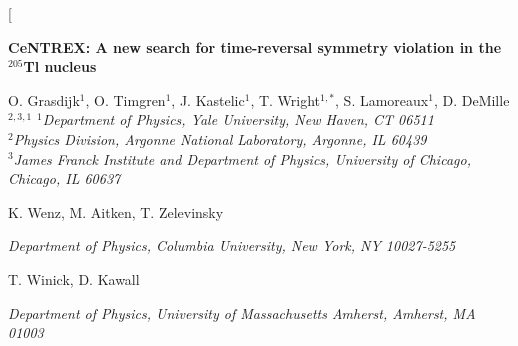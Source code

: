 

\appendix


%
%

{

	\small
	
	
}



\twocolumn[
\begin{@twocolumnfalse}
	\begin{center}
		\begin{minipage}{.8\textwidth}
			\centering
			\vspace{4.5ex}

			{\bf\large CeNTREX: A new search for time-reversal symmetry violation in the $^{205}$Tl nucleus}

			\vspace{1.5ex}
			O. Grasdijk$^1$, O. Timgren$^1$, J. Kastelic$^1$, T. Wright$^{1,*}$, S. Lamoreaux$^1$, D. DeMille$^{2,3,1}$
			{\it\small 
			$^1$Department of Physics, Yale University, New Haven, CT 06511\\
			$^2$Physics Division, Argonne National Laboratory, Argonne, IL 60439\\
			$^3$James Franck Institute and Department of Physics, University of Chicago, Chicago, IL 60637
			}

			\vspace{1.5ex}
			K. Wenz, M. Aitken, T. Zelevinsky

			{\it\small Department of Physics, Columbia University, New York, NY 10027-5255}

			\vspace{1.5ex}
			T. Winick, D. Kawall

			{\it\small Department of Physics, University of Massachusetts Amherst, Amherst, MA 01003}
		\end{minipage}

		\vspace{3ex}


\end{center}
\end{@twocolumnfalse}
